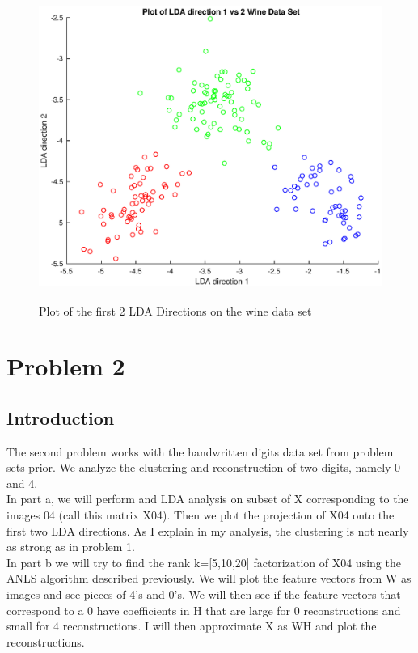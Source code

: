 \documentclass{article}
\begin{document}
\begin{figure}[h!]
    \centerline
    {
    \includegraphics[width=20cm, height=10cm]{Q1_2LDA_Directions}
    }
    \caption{\label{fig:my figure} Plot of the first 2 LDA Directions on the wine data set }
\end{figure}


\section*{Problem 2}
\subsection*{Introduction}
The second problem works with the handwritten digits data set from problem sets prior.  We analyze the clustering and reconstruction of two digits, namely 0 and 4.\\
In part a, we will perform and LDA analysis on subset of X corresponding to the images 04 (call this matrix X04).  Then we plot the projection of X04 onto the first two LDA directions.  As I explain in my analysis, the clustering is not nearly as strong as in problem 1.  \\
In part b we will try to find the rank k=[5,10,20] factorization of X04 using the ANLS algorithm described previously.  We will plot the feature vectors from W as images and see pieces of 4's and 0's.   We will then see if the feature vectors that correspond to a 0 have coefficients in H that are large for 0 reconstructions and  small for 4 reconstructions.  I will then approximate X as WH and plot the reconstructions.  
\end{document}
